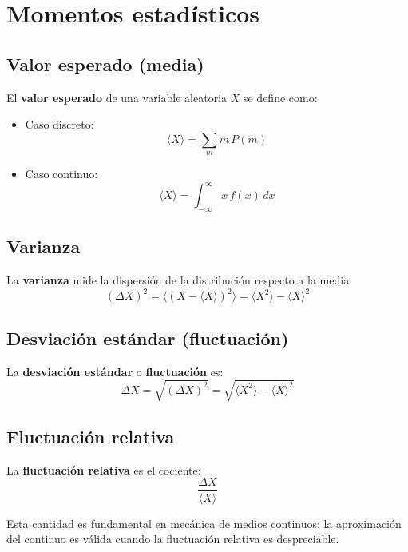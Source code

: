 \section{Momentos estadísticos}

\subsection{Valor esperado (media)}

El \textbf{valor esperado} de una variable aleatoria $X$ se define como:

\begin{itemize}
    \item Caso discreto:
$$
\langle X \rangle = \sum_{m} m\, P(m)
$$

    \item Caso continuo:
$$
\langle X \rangle = \int_{-\infty}^{\infty} x\, f(x)\, dx
$$
\end{itemize}

\subsection{Varianza}

La \textbf{varianza} mide la dispersión de la distribución respecto a la media:
$$
(\Delta X)^2 = \langle (X - \langle X \rangle)^2 \rangle = \langle X^2 \rangle - \langle X \rangle^2
$$

\subsection{Desviación estándar (fluctuación)}

La \textbf{desviación estándar} o \textbf{fluctuación} es:
$$
\Delta X = \sqrt{(\Delta X)^2} = \sqrt{\langle X^2 \rangle - \langle X \rangle^2}
$$

\subsection{Fluctuación relativa}

La \textbf{fluctuación relativa} es el cociente:
$$
\frac{\Delta X}{\langle X \rangle}
$$

Esta cantidad es fundamental en mecánica de medios continuos: la aproximación del continuo es válida cuando la fluctuación relativa es despreciable.

